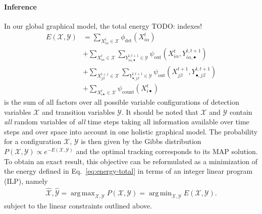 \documentclass[10pt,twocolumn,letterpaper]{article}
\DeclareMathOperator*{\argmin}{arg\,min}
\DeclareMathOperator*{\argmax}{arg\,max}
\newcommand{\red}{\color{red}}
\begin{document}


\paragraph{Inference} In our global graphical model, the total energy {\red TODO: indexes!}
\begin{align}
    \label{eq:energy-total}
    E(\mathcal{X}, \mathcal{Y}) &= \sum_{X_{i\alpha}^t \in \mathcal{X}} \phi_{\text{det}}(X_{i\alpha}^t) \\
    &+ \sum_{X_{i\alpha}^t \in \mathcal{X}} \sum_{Y_{i\alpha ,\bullet}^{t,t+1} \in \mathcal{Y}} \psi_{\text{out}}(X_{i\alpha}^t, Y_{i\alpha ,\bullet}^{t,t+1}) \nonumber\\
    &+ \sum_{X_{j\beta}^{t+1} \in \mathcal{X}} \sum_{Y_{\bullet, j\beta}^{t,t+1} \in \mathcal{Y}} \psi_{\text{out}}(X_{j\beta}^{t+1}, Y_{\bullet, j\beta}^{t,t+1}) \nonumber\\
    &+ \sum_{X_{i\bullet}^t \in \mathcal{X}} \psi_{\text{count}}(X_{i\bullet}^t) \nonumber
\end{align}
is the sum of all factors over all possible variable configurations of detection variables $\mathcal{X}$ and transition variables $\mathcal{Y}$.
It should be noted that $\mathcal{X}$ and $\mathcal Y$ contain \emph{all} random variables of \emph{all} time steps taking all information 
available over time steps and over space into account in one holistic graphical model.
The probability for a configuration $\mathcal{X}$, $\mathcal{Y}$ is then given by
the Gibbs distribution
$P(\mathcal{X},\mathcal{Y}) \propto e^{-E(\mathcal{X},\mathcal{Y})}$ and
the optimal tracking corresponds to its MAP solution. To obtain an exact result, this objective 
can be reformulated as a minimization of
the energy defined in Eq.~\eqref{eq:energy-total} in terms of an integer linear program (ILP), namely
\begin{align}
    \label{eq:factor-graph-argmin}
    \hat{\mathcal{X}},\hat{\mathcal{Y}} = \argmax_{\mathcal{X},\mathcal{Y}}P(\mathcal{X},\mathcal{Y}) = \argmin_{\mathcal{X},\mathcal{Y}}E(\mathcal{X},\mathcal{Y}).
\end{align}
subject to the linear constraints outlined above.
\end{document}
